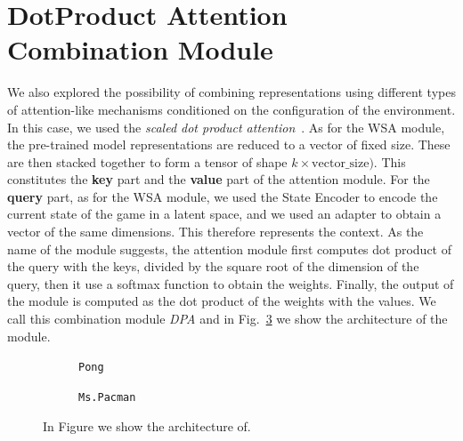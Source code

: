 \section{DotProduct Attention Combination Module}
\label{sec:dpa}

We also explored the possibility of combining representations using different types of attention-like mechanisms conditioned on the configuration of the environment.
In this case, we used the \textit{scaled dot product attention}~\citep{vaswani2017attention}.
As for the WSA module, the pre-trained model representations are reduced to a vector of fixed size.
These are then stacked together to form a tensor of shape $k \times \text{vector\_size})$.
This constitutes the \textbf{key} part and the \textbf{value} part of the attention module.
For the \textbf{query} part, as for the WSA module, we used the State Encoder to encode the current state of the game in a latent space, and we used an adapter to obtain a vector of the same dimensions.
This therefore represents the context.
As the name of the module suggests, the attention module first computes dot product of the query with the keys, divided by the square root of the dimension of the query, then it use a softmax function to obtain the weights.
Finally, the output of the module is computed as the dot product of the weights with the values.
We call this combination module \textit{DPA} and in Fig.~\ref{fig:dpa_combination} we show the architecture of the module.





\begin{figure}[ht]
    \centering
    \begin{subfigure}[b]{0.47\textwidth}
        \centering
        \fbox{\rule[-.5cm]{0cm}{4cm} \rule[-.5cm]{4cm}{0cm}}
        \caption{\texttt{Pong}}
        \label{fig:reservoir_combination}
    \end{subfigure}
    \hfill
    \begin{subfigure}[b]{0.47\textwidth}
        \centering
        \fbox{\rule[-.5cm]{0cm}{4cm} \rule[-.5cm]{4cm}{0cm}}
        \caption{\texttt{Ms.Pacman}}
        \label{fig:dpa}
    \end{subfigure}

    \caption{In Figure we show the architecture of.}
    \label{fig:dpa_combination}
\end{figure}




